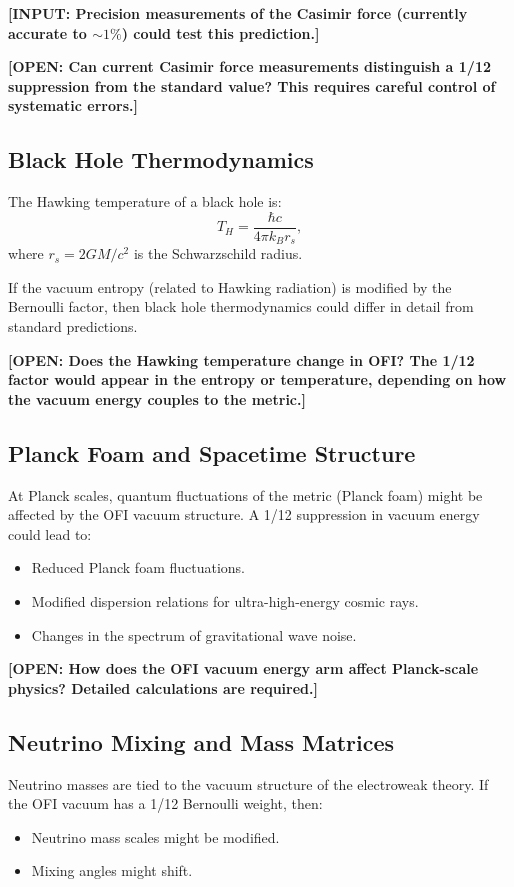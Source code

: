 \documentclass[12pt]{article}
\theoremstyle{definition}
\newcommand{\INPUT}[1]{\textcolor{inputcolor}{\textbf{[INPUT: #1]}}}
\newcommand{\OPEN}[1]{\textcolor{opencolor}{\textbf{[OPEN: #1]}}}
\begin{document}
\INPUT{Precision measurements of the Casimir force (currently accurate to $\sim 1\%$)
could test this prediction.}

\OPEN{Can current Casimir force measurements distinguish a 1/12 suppression from the
standard value? This requires careful control of systematic errors.}

\subsection{Black Hole Thermodynamics}

The Hawking temperature of a black hole is:
\begin{equation}
  T_H = \frac{\hbar c}{4\pi k_B r_s},
\end{equation}
where $r_s = 2GM/c^2$ is the Schwarzschild radius.

If the vacuum entropy (related to Hawking radiation) is modified by the Bernoulli factor,
then black hole thermodynamics could differ in detail from standard predictions.

\OPEN{Does the Hawking temperature change in OFI? The 1/12 factor would appear in the
entropy or temperature, depending on how the vacuum energy couples to the metric.}

\subsection{Planck Foam and Spacetime Structure}

At Planck scales, quantum fluctuations of the metric (Planck foam) might be affected
by the OFI vacuum structure. A 1/12 suppression in vacuum energy could lead to:
\begin{itemize}
  \item Reduced Planck foam fluctuations.
  \item Modified dispersion relations for ultra-high-energy cosmic rays.
  \item Changes in the spectrum of gravitational wave noise.
\end{itemize}

\OPEN{How does the OFI vacuum energy arm affect Planck-scale physics? Detailed calculations
are required.}

\subsection{Neutrino Mixing and Mass Matrices}

Neutrino masses are tied to the vacuum structure of the electroweak theory. If the
OFI vacuum has a 1/12 Bernoulli weight, then:
\begin{itemize}
  \item Neutrino mass scales might be modified.
  \item Mixing angles might shift.
\end{itemize}
\end{document}
